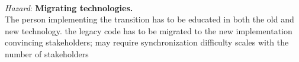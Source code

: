 \ \\

\textit{Hazard}: \textbf{Migrating technologies.} \\
The person implementing the transition has to be educated in both the old and new technology. 
the legacy code has to be migrated to the new implementation
convincing stakeholders; may require synchronization
difficulty scales with the number of stakeholders 